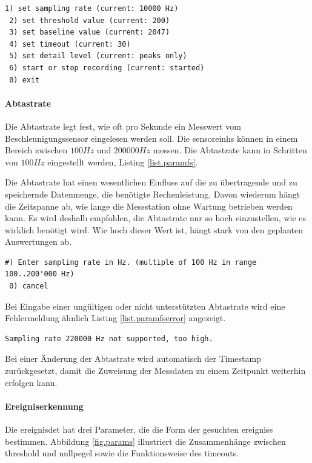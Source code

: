 \begin{lstlisting}[caption=Untermenü Sensor-Parameter, label=list.sensorparam]
 1) set sampling rate (current: 10000 Hz)
 2) set threshold value (current: 200)
 3) set baseline value (current: 2047)
 4) set timeout (current: 30)
 5) set detail level (current: peaks only)
 6) start or stop recording (current: started)
 0) exit
\end{lstlisting}

\paragraph{Abtastrate} Die Abtastrate legt fest, wie oft pro Sekunde ein Messwert vom Beschleunigungssensor eingelesen werden soll. Die \glspl{sensoreinh} können in einem Bereich zwischen \ensuremath{100 Hz} und \ensuremath{200000 Hz} messen. Die Abtastrate kann in Schritten von \ensuremath{100 Hz} eingestellt werden, Listing \ref{list.paramfs}.

Die Abtastrate hat einen wesentlichen Einfluss auf die zu übertragende und zu speichernde Datenmenge, die benötigte Rechenleistung. Davon wiederum hängt die Zeitspanne ab, wie lange die Messstation ohne Wartung betrieben werden kann. Es wird deshalb empfohlen, die Abtastrate nur so hoch einzustellen, wie es wirklich benötigt wird. Wie hoch dieser Wert ist, hängt stark von den geplanten Auswertungen ab.

\begin{lstlisting}[caption=Untermenü Abtastrate, label=list.paramfs]
 #) Enter sampling rate in Hz. (multiple of 100 Hz in range 100..200'000 Hz)
 0) cancel
\end{lstlisting}

Bei Eingabe einer ungültigen oder nicht unterstützten Abtastrate wird eine Fehlermeldung ähnlich Listing \ref{list.paramfserror} angezeigt.

\begin{lstlisting}[caption=Fehlermeldung bei ungültiger Abtastrate, label=list.paramfserror]
Sampling rate 220000 Hz not supported, too high.
\end{lstlisting}

Bei einer Änderung der Abtastrate wird automatisch der Timestamp zurückgesetzt, damit die Zuweisung der Messdaten zu einem Zeitpunkt weiterhin erfolgen kann.

\paragraph{Ereigniserkennung} Die \gls{ereignisdet} hat drei Parameter, die die Form der gesuchten \glspl{ereignis} bestimmen.  Abbildung \ref{fig.params} illustriert die Zusammenhänge zwischen \gls{threshold} und \gls{nullpegel} sowie die Funktionsweise des \gls{timeout}s.

